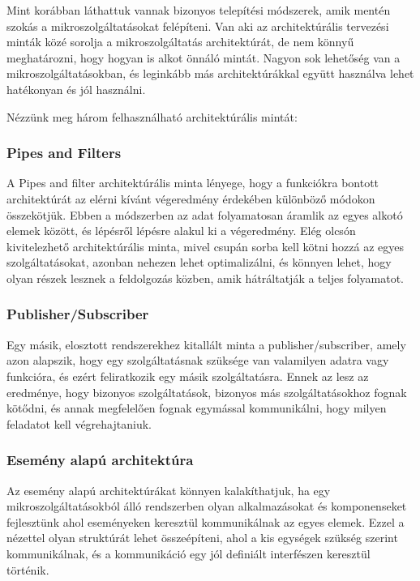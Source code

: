 \documentclass[11pt,magyar,a4paper,twoside,]{report}
\begin{document}
Mint korábban láthattuk vannak bizonyos telepítési módszerek, amik
mentén szokás a mikroszolgáltatásokat felépíteni. Van aki az
architektúrális tervezési minták közé sorolja a mikroszolgáltatás
architektúrát, de nem könnyű meghatározni, hogy hogyan is alkot önnáló
mintát. Nagyon sok lehetőség van a mikroszolgáltatásokban, és leginkább
más architektúrákkal együtt használva lehet hatékonyan és jól használni.

Nézzünk meg három felhasználható architektúrális mintát:

\subsubsection{Pipes and Filters}\label{pipes-and-filters}

A Pipes and filter architektúrális minta\citep{pipes-pattern} lényege,
hogy a funkciókra bontott architektúrát az elérni kívánt végeredmény
érdekében különböző módokon összekötjük. Ebben a módszerben az adat
folyamatosan áramlik az egyes alkotó elemek között, és lépésről lépésre
alakul ki a végeredmény. Elég olcsón kivitelezhető architektúrális
minta, mivel csupán sorba kell kötni hozzá az egyes szolgáltatásokat,
azonban nehezen lehet optimalizálni, és könnyen lehet, hogy olyan részek
lesznek a feldolgozás közben, amik hátráltatják a teljes folyamatot.

\subsubsection{Publisher/Subscriber}\label{publishersubscriber}

Egy másik, elosztott rendszerekhez kitallált minta a
publisher/subscriber\citep{pub-subscribed}, amely azon alapszik, hogy
egy szolgáltatásnak szüksége van valamilyen adatra vagy funkcióra, és
ezért feliratkozik egy másik szolgáltatásra. Ennek az lesz az eredménye,
hogy bizonyos szolgáltatások, bizonyos más szolgáltatásokhoz fognak
kötődni, és annak megfelelően fognak egymással kommunikálni, hogy milyen
feladatot kell végrehajtaniuk.

\subsubsection{Esemény alapú
architektúra}\label{esemuxe9ny-alapuxfa-architektuxfara}

Az esemény alapú architektúrákat\citep{event-driven-pattern} könnyen
kalakíthatjuk, ha egy mikroszolgáltatásokból álló rendszerben olyan
alkalmazásokat és komponenseket fejlesztünk ahol eseményeken keresztül
kommunikálnak az egyes elemek. Ezzel a nézettel olyan struktúrát lehet
összeépíteni, ahol a kis egységek szükség szerint kommunikálnak, és a
kommunikáció egy jól definiált interfészen keresztül történik.
\end{document}
